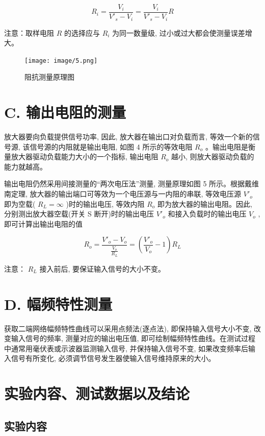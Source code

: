 \documentclass[10pt, a4paper]{article} %
\begin{document}
 $$
R_i = \frac{V_i}{V'_s - V_i} = \frac{V_i}{V'_s - V_i} R
$$ 

注意：取样电阻  $ R $  的选择应与  $ R_i $  为同一数量级, 过小或过大都会使测量误差增大。

\begin{figure}[h]
    \centering
    \texttt{[image: image/5.png]}
    \caption{阻抗测量原理图}
    \label{fig:input_resistance_measurement}
\end{figure}


\section*{C. 输出电阻的测量}

放大器要向负载提供信号功率, 因此, 放大器在输出口对负载而言, 等效一个新的信号源, 该信号源的内阻就是输出电阻, 如图 4 所示的等效电阻  $ R_o $ 。输出电阻是衡量放大器驱动负载能力大小的一个指标, 输出电阻  $ R_o $  越小, 则放大器驱动负载的能力就越高。

输出电阻仍然采用间接测量的“两次电压法”测量, 测量原理如图 5 所示。根据戴维南定理, 放大器的输出端口可等效为一个电压源与一内阻的串联, 等效电压源  $ V'_o $  即为空载( $ R_L = \infty $ )时的输出电压, 等效内阻  $ R_o $  即为放大器的输出电阻。因此, 分别测出放大器空载(开关 S 断开)时的输出电压  $ V'_o $  和接入负载时的输出电压  $ V_o $ , 即可计算出输出电阻的值


 $$
R_o = \frac{V'_o - V_o}{\frac{V_o}{R_L}} = \left(\frac{V'_o}{V_o} - 1\right) R_L
$$ 

注意： $ R_L $  接入前后, 要保证输入信号的大小不变。


\section*{D. 幅频特性测量}

获取二端网络幅频特性曲线可以采用点频法(逐点法), 即保持输入信号大小不变, 改变输入信号的频率, 测量对应的输出电压值, 即可绘制幅频特性曲线。在测试过程中通常用毫伏表或示波器监测输入信号, 并保持输入信号不变, 如果改变频率后输入信号有所变化, 必须调节信号发生器使输入信号维持原来的大小。

\newpage


\section{实验内容、测试数据以及结论}
\subsection{实验内容}
\end{document}
